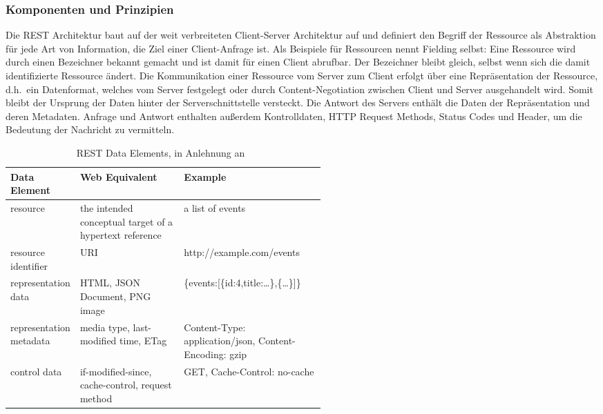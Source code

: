 \subsubsection{Komponenten und Prinzipien}
Die REST Architektur baut auf der weit verbreiteten Client-Server Architektur auf und definiert den Begriff der Ressource als Abstraktion für jede Art von Information, die Ziel einer Client-Anfrage ist.\cite[vgl.][88f.]{REST}
Als Beispiele für Ressourcen nennt Fielding selbst: 
Eine Ressource wird durch einen Bezeichner bekannt gemacht und ist damit für einen Client abrufbar.
Der Bezeichner bleibt gleich, selbst wenn sich die damit identifizierte Ressource ändert.
Die Kommunikation einer Ressource vom Server zum Client erfolgt über eine Repräsentation der Ressource, d.h.\ ein Datenformat, welches vom Server festgelegt oder durch Content-Negotiation zwischen Client und Server ausgehandelt wird.
Somit bleibt der Ursprung der Daten hinter der Serverschnittstelle versteckt.
Die Antwort des Servers enthält die Daten der Repräsentation und deren Metadaten.
Anfrage und Antwort enthalten außerdem Kontrolldaten, \zB{} HTTP Request Methods, Status Codes und Header, um die Bedeutung der Nachricht zu vermitteln.\cite[vgl.][90f.]{REST}
{
\begin{table}[h!]
  \begin{center}
    \caption{REST Data Elements, in Anlehnung an~\cite[88]{REST}}\label{tab:REST Data Elemens}
    \begin{tabularx}{\linewidth}{m{0.2\linewidth}m{0.33\linewidth}X}
      \rowcolor{blue!40!white!50!black!10}\textbf{Data Element} & \textbf{Web Equivalent} & \textbf{Example}\\
      \midrule
      resource & the intended conceptual target of a hypertext reference & a list of events\\
      resource identifier & URI & http://example.com/events\\
      representation data & HTML, JSON Document, PNG image & \{events:[\{id:4,title:\dots\},\{\dots\}]\}\\
      representation metadata & media type, last-modified time, ETag & Content-Type: application/json, Content-Encoding: gzip\\
      control data & if-modified-since, cache-control, request method & GET, Cache-Control: no-cache\\
    \end{tabularx}
  \end{center}
\end{table}
}
